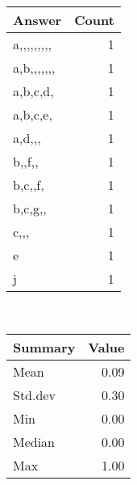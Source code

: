 \documentclass[12pt,english,nohyper]{tufte-handout}\usepackage[]{graphicx}\usepackage[]{color}
\begin{document}
\begin{center}%
\begin{tabular}{lr}
  \hline
Answer & Count \\ 
  \hline
a,,,,,,,,, &   1 \\ 
  a,b,,,,,,, &   1 \\ 
  a,b,c,d, &   1 \\ 
  a,b,c,e, &   1 \\ 
  a,d,,, &   1 \\ 
  b,,f,, &   1 \\ 
  b,c,,f, &   1 \\ 
  b,c,g,, &   1 \\ 
  c,,, &   1 \\ 
  e &   1 \\ 
  j &   1 \\ 
   \hline
\end{tabular}
~~~~~~~~%
\begin{tabular}{lr}
  \hline
Summary & Value \\ 
  \hline
Mean & 0.09 \\ 
  Std.dev & 0.30 \\ 
  Min & 0.00 \\ 
  Median & 0.00 \\ 
  Max & 1.00 \\ 
   \hline
\end{tabular}
\end{center}\newpage{}
\end{document}
